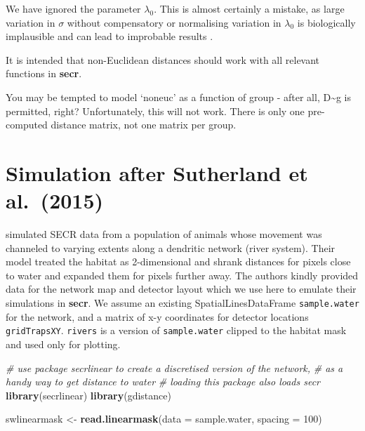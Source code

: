 \documentclass[
]{book}
\newenvironment{Shaded}{\begin{snugshade}}{\end{snugshade}}
\newcommand{\AttributeTok}[1]{\textcolor[rgb]{0.13,0.29,0.53}{#1}}
\newcommand{\CommentTok}[1]{\textcolor[rgb]{0.56,0.35,0.01}{\textit{#1}}}
\newcommand{\DecValTok}[1]{\textcolor[rgb]{0.00,0.00,0.81}{#1}}
\newcommand{\FunctionTok}[1]{\textcolor[rgb]{0.13,0.29,0.53}{\textbf{#1}}}
\newcommand{\NormalTok}[1]{#1}
\newcommand{\OtherTok}[1]{\textcolor[rgb]{0.56,0.35,0.01}{#1}}
\begin{document}
We have ignored the parameter \(\lambda_0\). This is almost certainly a mistake, as large variation in \(\sigma\) without compensatory or normalising variation in \(\lambda_0\) is biologically implausible and can lead to improbable results \citep[\citet{e14}]{em14}.

It is intended that non-Euclidean distances should work with all relevant functions in \textbf{secr}.

You may be tempted to model `noneuc' as a function of group - after all, D\textasciitilde g is permitted, right? Unfortunately, this will not work. There is only one pre-computed distance matrix, not one matrix per group.

\section{Simulation after Sutherland et al.~(2015)}\label{simulation-after-sutherland-et-al.-2015}


\citet{sfr15} simulated SECR data from a population of animals whose movement was channeled to varying extents along a dendritic network (river system). Their model treated the habitat as 2-dimensional and shrank distances for pixels close to water and expanded them for pixels further away. The authors kindly provided data for the network map and detector layout which we use here to emulate their simulations in \textbf{secr}. We assume an existing SpatialLinesDataFrame \texttt{sample.water} for the network, and a matrix of x-y coordinates for detector locations \texttt{gridTrapsXY}. \texttt{rivers} is a version of \texttt{sample.water} clipped to the habitat mask and used only for plotting.

\begin{Shaded}
\begin{Highlighting}[]
\CommentTok{\# use package secrlinear to create a discretised version of the network,}
\CommentTok{\# as a handy way to get distance to water }
\CommentTok{\# loading this package also loads secr}
\FunctionTok{library}\NormalTok{(secrlinear)}
\FunctionTok{library}\NormalTok{(gdistance)}
\end{Highlighting}
\end{Shaded}

\begin{Shaded}
\begin{Highlighting}[]
\NormalTok{swlinearmask }\OtherTok{\textless{}{-}} \FunctionTok{read.linearmask}\NormalTok{(}\AttributeTok{data =}\NormalTok{ sample.water, }\AttributeTok{spacing =} \DecValTok{100}\NormalTok{)}
\end{Highlighting}
\end{Shaded}
\end{document}
